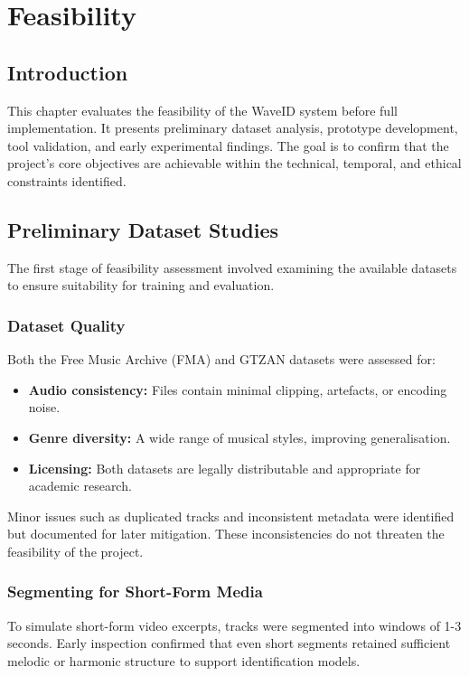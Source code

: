 \documentclass[../Thesis]{subfiles}
\begin{document}
\chapter{Feasibility} \label{chapter4}
\section{Introduction}
This chapter evaluates the feasibility of the WaveID system before full implementation. It presents preliminary dataset analysis, prototype development, tool validation, and early experimental findings. The goal is to confirm that the project's core objectives are achievable within the technical, temporal, and ethical constraints identified.

\section{Preliminary Dataset Studies}
The first stage of feasibility assessment involved examining the available datasets to ensure suitability for training and evaluation.

\subsection{Dataset Quality}
Both the Free Music Archive (FMA) and GTZAN datasets were assessed for:
\begin{itemize}
    \item \textbf{Audio consistency:} Files contain minimal clipping, artefacts, or encoding noise.
    \item \textbf{Genre diversity:} A wide range of musical styles, improving generalisation.
    \item \textbf{Licensing:} Both datasets are legally distributable and appropriate for academic research.
\end{itemize}

Minor issues such as duplicated tracks and inconsistent metadata were identified but documented for later mitigation. These inconsistencies do not threaten the feasibility of the project.

\subsection{Segmenting for Short-Form Media}
To simulate short-form video excerpts, tracks were segmented into windows of 1-3 seconds. Early inspection confirmed that even short segments retained sufficient melodic or harmonic structure to support identification models.
\end{document}
